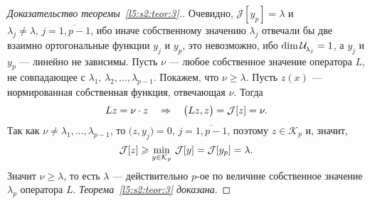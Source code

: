 \documentclass[12pt,a4paper,openany,fleqn]{book}
\newcommand{\J}{\ensuremath{\mathcal{J}}}
\newcommand{\mc}[1]{\ensuremath{\mathcal{#1}}}
\newcommand{\K}{\mc{K}}
\newcommand{\Ul}[1][\lambda]{\ensuremath{\mc{U}\!{\mathstrut}_{#1}}}
\theoremstyle{definition}
\begin{document}
\begin{proof}[Доказательство теоремы~\ref{l5:s2:teor:3}.]
Очевидно, $\J[y_p]=\lambda$ и $\lambda_j\neq\lambda,\,j=\overline{1,p-1}$, ибо иначе собственному значению $\lambda_j$ отвечали бы две взаимно ортогональные функции $y_j$ и $y_p$, это невозможно, ибо $\dim\Ul[\lambda_j]=1$, а $y_j$ и $y_p$ --- линейно не зависимы. Пусть $\nu$ --- любое собственное значение оператора $L$, не совпадающее с $\lambda_1,\,\lambda_2,\ldots,\lambda_{p-1}$. Покажем, что $\nu\geqslant\lambda$. Пусть $z(x)$ --- нормированная собственная функция, отвечающая $\nu$. Тогда 
\begin{equation*}
	\hfill Lz=\nu\cdot z\quad\Rightarrow\quad\big(Lz,z\big)=\J[z]=\nu.\hfill
\end{equation*} 
Так как $\nu\neq\lambda_1,\ldots,\lambda_{p-1}$, то $\big(z,y_j\big)=0,\,j=\overline{1,p-1}$, поэтому $z\in\K_p$ и, значит,
\begin{equation*}
	\hfill\J[z]\geqslant\min\limits_{y\in\K_p}\,\J[y]=\J[y_p]=\lambda.\hfill
\end{equation*} 
Значит $\nu\geqslant\lambda$, то есть $\lambda$ --- действительно $p$-ое по величине собственное значение $\lambda_p$ оператора $L$. \emph{Теорема~\ref{l5:s2:teor:3} доказана}. 
\end{proof}
\end{document}
